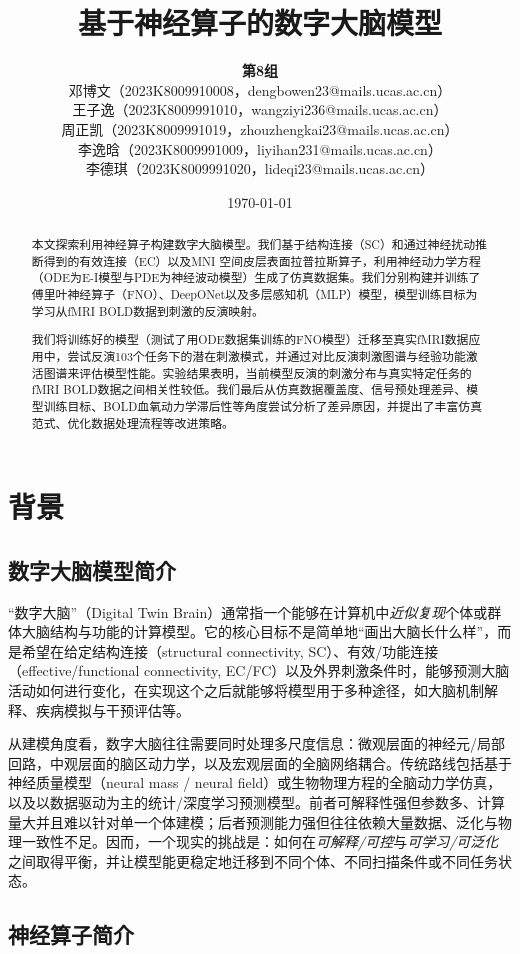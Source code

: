 \documentclass[12pt,a4paper]{article}
\title{基于神经算子的数字大脑模型}
\author{\textbf{第8组}\\
邓博文（2023K8009910008，dengbowen23@mails.ucas.ac.cn）\\
王子逸（2023K8009991010，wangziyi236@mails.ucas.ac.cn）\\
周正凯（2023K8009991019，zhouzhengkai23@mails.ucas.ac.cn）\\
李逸晗（2023K8009991009，liyihan231@mails.ucas.ac.cn）\\
李德琪（2023K8009991020，lideqi23@mails.ucas.ac.cn）\\
}
\date{\today}
\begin{document}
\maketitle

\begin{abstract}

本文探索利用神经算子构建数字大脑模型。我们基于结构连接（SC）和通过神经扰动推断得到的有效连接（EC）以及MNI 空间皮层表面拉普拉斯算子，利用神经动力学方程（ODE为E-I模型与PDE为神经波动模型）生成了仿真数据集。我们分别构建并训练了傅里叶神经算子（FNO）、DeepONet以及多层感知机（MLP）模型，模型训练目标为学习从fMRI BOLD数据到刺激的反演映射。

我们将训练好的模型（测试了用ODE数据集训练的FNO模型）迁移至真实fMRI数据应用中，尝试反演103个任务下的潜在刺激模式，并通过对比反演刺激图谱与经验功能激活图谱来评估模型性能。实验结果表明，当前模型反演的刺激分布与真实特定任务的fMRI BOLD数据之间相关性较低。我们最后从仿真数据覆盖度、信号预处理差异、模型训练目标、BOLD血氧动力学滞后性等角度尝试分析了差异原因，并提出了丰富仿真范式、优化数据处理流程等改进策略。
\end{abstract}

\newpage
\section{背景}
\subsection{数字大脑模型简介}

“数字大脑”（Digital Twin Brain）通常指一个能够在计算机中\emph{近似复现}个体或群体大脑结构与功能的计算模型。它的核心目标不是简单地“画出大脑长什么样”，而是希望在给定结构连接（structural connectivity, SC）、有效/功能连接（effective/functional connectivity, EC/FC）以及外界刺激条件时，能够预测大脑活动如何进行变化，在实现这个之后就能够将模型用于多种途径，如大脑机制解释、疾病模拟与干预评估等。

从建模角度看，数字大脑往往需要同时处理多尺度信息：微观层面的神经元/局部回路，中观层面的脑区动力学，以及宏观层面的全脑网络耦合。传统路线包括基于神经质量模型（neural mass / neural field）或生物物理方程的全脑动力学仿真，以及以数据驱动为主的统计/深度学习预测模型。前者可解释性强但参数多、计算量大并且难以针对单一个体建模；后者预测能力强但往往依赖大量数据、泛化与物理一致性不足。因而，一个现实的挑战是：如何在\emph{可解释/可控}与\emph{可学习/可泛化}之间取得平衡，并让模型能更稳定地迁移到不同个体、不同扫描条件或不同任务状态。

\subsection{神经算子简介}
\end{document}
